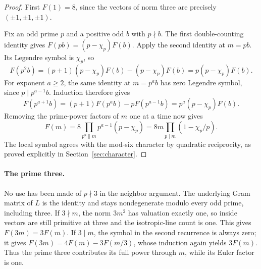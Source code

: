 \begin{proof}
First $F(1)=8$, since the vectors of norm three are precisely
$(\pm1,\pm1,\pm1)$.

Fix an odd prime $p$ and a positive odd $b$ with $p\nmid b$.
The first double-counting identity gives
$F(pb)=(p-\chi_p)F(b)$. Apply the second identity at $m=pb$.
Its Legendre symbol is $\chi_p$, so
\[
 F(p^2b)=(p+1)(p-\chi_p)F(b)-(p-\chi_p)F(b)
        =p(p-\chi_p)F(b).
\]
For exponent $a\ge2$, the same identity at $m=p^ab$ has zero
Legendre symbol, since $p\mid p^{a-1}b$. Induction therefore gives
\[
 F(p^{a+1}b)=(p+1)F(p^ab)-pF(p^{a-1}b)
            =p^a(p-\chi_p)F(b).
\]
Removing the prime-power factors of $m$ one at a time now gives
\[
 F(m)=8\prod_{p^a\parallel m}p^{a-1}(p-\chi_p)
     =8m\prod_{p\mid m}(1-\chi_p/p).
\]
The local symbol agrees with the mod-six character by quadratic
reciprocity, as proved explicitly in Section~\ref{sec:character}.
\end{proof}
\paragraph{The prime three.}
No use has been made of $p\nmid3$ in the neighbor argument. The
underlying Gram matrix of $L$ is the identity and stays nondegenerate
modulo every odd prime, including three. If $3\nmid m$, the norm
$3m^2$ has valuation exactly one, so inside vectors are still
primitive at three and the isotropic-line count is one. This gives
$F(3m)=3F(m)$. If $3\mid m$, the symbol in the second recurrence is
always zero; it gives
$F(3m)=4F(m)-3F(m/3)$, whose induction again yields $3F(m)$.
Thus the prime three contributes its full power through $m$, while
its Euler factor is one.

